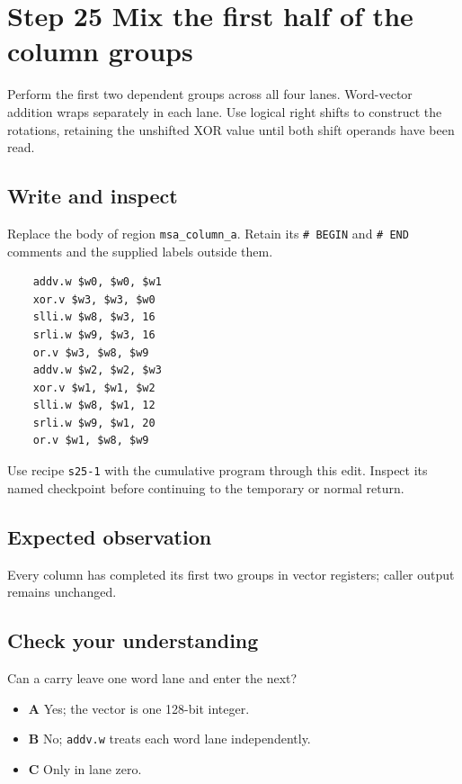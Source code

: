 \section{Step 25 Mix the first half of the column groups}\label{chacha-s25}

Perform the first two dependent groups across all four lanes. Word-vector addition wraps separately in each lane. Use logical right shifts to construct the rotations, retaining the unshifted XOR value until both shift operands have been read.

\subsection{Write and inspect}
Replace the body of region \texttt{msa\_column\_a}. Retain its \texttt{\# BEGIN} and \texttt{\# END} comments and the supplied labels outside them.

\begin{verbatim}
    addv.w $w0, $w0, $w1
    xor.v $w3, $w3, $w0
    slli.w $w8, $w3, 16
    srli.w $w9, $w3, 16
    or.v $w3, $w8, $w9
    addv.w $w2, $w2, $w3
    xor.v $w1, $w1, $w2
    slli.w $w8, $w1, 12
    srli.w $w9, $w1, 20
    or.v $w1, $w8, $w9
\end{verbatim}

Use recipe \texttt{s25-1} with the cumulative program through this edit. Inspect its named checkpoint before continuing to the temporary or normal return.

\subsection{Expected observation}
Every column has completed its first two groups in vector registers; caller output remains unchanged.

\subsection{Check your understanding}
Can a carry leave one word lane and enter the next?

\begin{itemize}
  \item \textbf{A} Yes; the vector is one 128-bit integer.
  \item \textbf{B} No; \texttt{addv.w} treats each word lane independently.
  \item \textbf{C} Only in lane zero.
\end{itemize}
